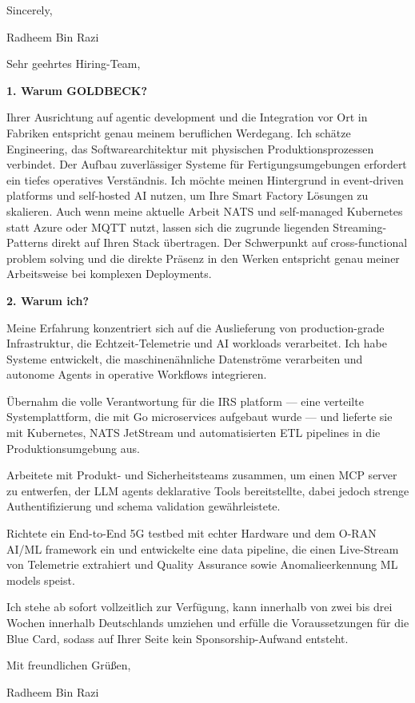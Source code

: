 \documentclass[11pt,a4paper]{coverletter}
\begin{document}
\closing{Sincerely,}{Radheem Bin Razi}

\clearpage
{}


\opening{Sehr geehrtes Hiring-Team,}

\vspace{8pt}\noindent\textbf{1. Warum GOLDBECK?}\par\vspace{3pt}

Ihrer Ausrichtung auf agentic development und die Integration vor Ort in Fabriken entspricht genau meinem beruflichen Werdegang. Ich schätze Engineering, das Softwarearchitektur mit physischen Produktionsprozessen verbindet. Der Aufbau zuverlässiger Systeme für Fertigungsumgebungen erfordert ein tiefes operatives Verständnis. Ich möchte meinen Hintergrund in event-driven platforms und self-hosted AI nutzen, um Ihre Smart Factory Lösungen zu skalieren. Auch wenn meine aktuelle Arbeit NATS und self-managed Kubernetes statt Azure oder MQTT nutzt, lassen sich die zugrunde liegenden Streaming-Patterns direkt auf Ihren Stack übertragen. Der Schwerpunkt auf cross-functional problem solving und die direkte Präsenz in den Werken entspricht genau meiner Arbeitsweise bei komplexen Deployments.

\vspace{8pt}\noindent\textbf{2. Warum ich?}\par\vspace{3pt}

Meine Erfahrung konzentriert sich auf die Auslieferung von production-grade Infrastruktur, die Echtzeit-Telemetrie und AI workloads verarbeitet. Ich habe Systeme entwickelt, die maschinenähnliche Datenströme verarbeiten und autonome Agents in operative Workflows integrieren.

\bullets

  \item Übernahm die volle Verantwortung für die IRS platform — eine verteilte Systemplattform, die mit Go microservices aufgebaut wurde — und lieferte sie mit Kubernetes, NATS JetStream und automatisierten ETL pipelines in die Produktionsumgebung aus.

  \item Arbeitete mit Produkt- und Sicherheitsteams zusammen, um einen MCP server zu entwerfen, der LLM agents deklarative Tools bereitstellte, dabei jedoch strenge Authentifizierung und schema validation gewährleistete.

  \item Richtete ein End-to-End 5G testbed mit echter Hardware und dem O-RAN AI/ML framework ein und entwickelte eine data pipeline, die einen Live-Stream von Telemetrie extrahiert und Quality Assurance sowie Anomalieerkennung ML models speist.

\bulletsend

Ich stehe ab sofort vollzeitlich zur Verfügung, kann innerhalb von zwei bis drei Wochen innerhalb Deutschlands umziehen und erfülle die Voraussetzungen für die Blue Card, sodass auf Ihrer Seite kein Sponsorship-Aufwand entsteht.

\closing{Mit freundlichen Grüßen,}{Radheem Bin Razi}
\end{document}
